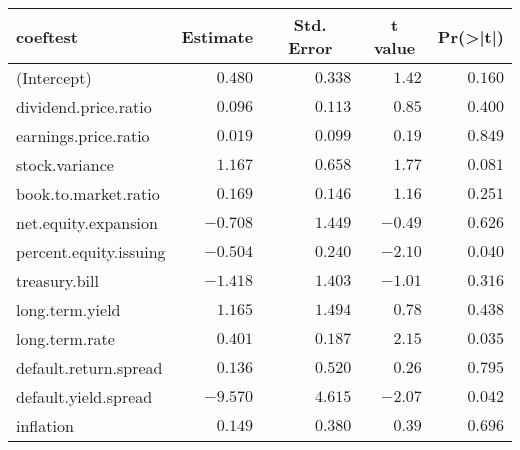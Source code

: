 %
\begin{table}[!tbp]
\begin{center}
\begin{tabular}{lrrrr}
\hline\hline
\multicolumn{1}{l}{coeftest}&\multicolumn{1}{c}{Estimate}&\multicolumn{1}{c}{Std. Error}&\multicolumn{1}{c}{t value}&\multicolumn{1}{c}{Pr(\textgreater |t|)}\tabularnewline
\hline
(Intercept)&$ 0.480$&$0.338$&$ 1.42$&$0.160$\tabularnewline
dividend.price.ratio&$ 0.096$&$0.113$&$ 0.85$&$0.400$\tabularnewline
earnings.price.ratio&$ 0.019$&$0.099$&$ 0.19$&$0.849$\tabularnewline
stock.variance&$ 1.167$&$0.658$&$ 1.77$&$0.081$\tabularnewline
book.to.market.ratio&$ 0.169$&$0.146$&$ 1.16$&$0.251$\tabularnewline
net.equity.expansion&$-0.708$&$1.449$&$-0.49$&$0.626$\tabularnewline
percent.equity.issuing&$-0.504$&$0.240$&$-2.10$&$0.040$\tabularnewline
treasury.bill&$-1.418$&$1.403$&$-1.01$&$0.316$\tabularnewline
long.term.yield&$ 1.165$&$1.494$&$ 0.78$&$0.438$\tabularnewline
long.term.rate&$ 0.401$&$0.187$&$ 2.15$&$0.035$\tabularnewline
default.return.spread&$ 0.136$&$0.520$&$ 0.26$&$0.795$\tabularnewline
default.yield.spread&$-9.570$&$4.615$&$-2.07$&$0.042$\tabularnewline
inflation&$ 0.149$&$0.380$&$ 0.39$&$0.696$\tabularnewline
\hline
\end{tabular}
\end{center}
\end{table}

